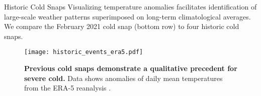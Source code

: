 \begin{block}{Historic Cold Snaps}
    Visualizing temperature anomalies facilitates identification of large-scale weather patterns superimposed on long-term climatological averages.
    We compare the February 2021 cold snap (bottom row) to four historic cold snaps.
    \begin{framed}
        \begin{figure}
            \centering
            \texttt{[image: historic\_events\_era5.pdf]}
            \caption{
                \textbf{Previous cold snaps demonstrate a qualitative precedent for severe cold.}
                Data shows anomalies of daily mean temperatures from the ERA-5 reanalysis \cite{hersbach_era5:2020}.
            }\label{fig:historic_era5}
        \end{figure}
    \end{framed}
\end{block}